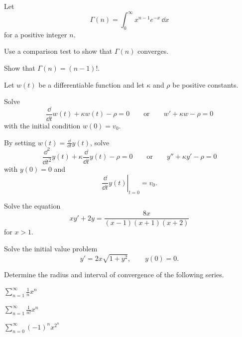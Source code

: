 \begin{problem}
Let
\[
\Gamma(n)=\int_0^\infty x^{n-1}e^{-x}\,\dd x
\]
for a positive integer $n$.
\begin{problemsubparts}
\item Use a comparison test to show that $\Gamma(n)$ converges.
\item Show that $\Gamma(n)=(n-1)!$.
\end{problemsubparts}
\end{problem}

\begin{problem}
Let $w(t)$ be a differentiable function and let $\kappa$ and $\rho$ be positive constants.
\begin{problemsubparts}
\item Solve
\[
\frac{\dd}{\dd t}w(t)+\kappa w(t)-\rho=0
\qquad\text{or}\qquad
w'+\kappa w-\rho=0
\]
with the initial condition $w(0)=v_0$.
\item By setting $w(t)=\displaystyle\frac{\dd}{\dd t}y(t)$, solve
\[
\frac{\dd^2}{\dd t^2}y(t)+\kappa\frac{\dd}{\dd t}y(t)-\rho=0
\qquad\text{or}\qquad
y''+\kappa y'-\rho=0
\]
with $y(0)=0$ and
\[
\left.\frac{\dd}{\dd t}y(t)\right|_{t=0}=v_0.
\]
\end{problemsubparts}
\end{problem}

\begin{problem}
\begin{problemchoices}
\item Solve the equation
\[
xy'+2y=\frac{8x}{(x-1)(x+1)(x+2)}
\]
for $x>1$.
\item Solve the initial value problem
\[
y'=2x\sqrt{1+y^2},
\qquad y(0)=0.
\]
\end{problemchoices}
\end{problem}

\begin{problem}
Determine the radius and interval of convergence of the following series.
\begin{problemchoices}
\item $\displaystyle\sum_{n=1}^{\infty}\frac1n x^n$
\item $\displaystyle\sum_{n=1}^{\infty}\frac1{n!}x^n$
\item $\displaystyle\sum_{n=0}^{\infty}(-1)^n x^{2^n}$
\end{problemchoices}
\end{problem}


